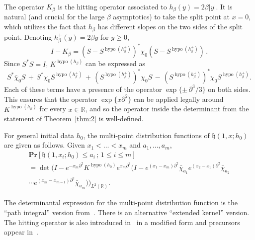 \documentclass[10pt]{amsart}
\theoremstyle{definition}\newtheorem{defi}[theo]{Definition}\newtheorem{rema}[theo]{Remark}\newtheorem{exam}[theo]{Example}\newtheorem{exem}[theo]{Example}\newtheorem{nota}[theo]{Notation}
\newcommand{\scdots}{{\mk{\cdot}\mK{\cdot}\mK{\cdot}\mk}}
\DeclareMathOperator{\hypo}{hypo}
\newcommand{\pr}[1]{\mathbf{Pr}\left[#1\right]}
\newcommand{\R}{\mathbb{R}}
\newcommand{\h}{\mathfrak{h}}
\newcommand*{\mk}{\mkern -1mu}
\newcommand*{\Mk}{\mkern -2mu}
\newcommand*{\mK}{\mkern 1mu}
\newcommand*{\MK}{\mkern 2mu}
\begin{document}
The operator $K_{\beta}$ is the hitting operator associated to $h_{\beta}(y) = 2\beta |y|$. It is natural (and crucial for the large $\beta$ asymptotics) to take the split point at $x = 0$, which utilizes the fact that $h_{\beta}$ has different slopes on the two sides of the split point. Denoting $h^{+}_{\beta}(y) = 2 \beta y$ for $y \geq 0$,
\begin{equation}\label{eqn:Khypo}
I - K_{\beta} = \left (S - S^{\hypo(h^{+}_{\beta})}\right)^{*} \chi_0
\left (S - S^{\hypo(h^{+}_{\beta})}\right)\,.
\end{equation}
Since $S^{*} S = I$, $K^{\hypo(h_{\beta})}$ can be expressed as
\[
S^{*} \bar{\chi}_0S \,+\, S^{*} \chi_0 S^{\hypo(h^{+}_{\beta})} \,+\, (S^{\hypo(h^{+}_{\beta})})^{*} \chi_0 S \,-\,
(S^{\hypo(h^{+}_{\beta})})^{*} \chi_0 S^{\hypo(h^{+}_{\beta})}.
\]
Each of these terms have a presence of the operator $\exp \{ \pm \, \partial^3/3 \}$ on both sides. This ensures that the operator $\exp\{ x \partial^2\}$ can be applied legally around $K^{\hypo(h_{\beta})}$ for every $x \in \R$, and so the operator inside the determinant from the statement of Theorem~\ref{thm:2} is well-defined.

For general initial data $h_0$, the multi-point distribution functions of $\h(1,x; h_0)$ are given as follows. Given $x_1 < \dots < x_m$ and $a_1, \dots, a_m$,
\begin{multline}\label{eqn:KPZjoint}
\pr{\h (1,x_i; h_0) \leq a_i\,;\, 1 \leq i \leq m} \\
=\det\Big(I-e^{-x_m \partial^2} K^{\hypo(h_0)}e^{x_m \partial^2}
\big(I-e^{(x_1-x_m)\partial^2}\bar{\chi}_{a_1} e^{(x_2-x_1)\partial^2} \bar{\chi}_{a_2}\\
\cdots e^{(x_m-x_{m-1})\partial^2} \bar{\chi}_{a_m}\big)\Big)_{L^2(\R)}.
\end{multline}

The determinantal expression for the multi-point distribution function is the ``path integral'' version from~\cite{MQR}. There is an alternative ``extended kernel'' version. The hitting operator is also introduced in~\cite{QR1} in a modified form and precursors appear in~\cite{BCR, CQR, PS, QR3}.
\end{document}
